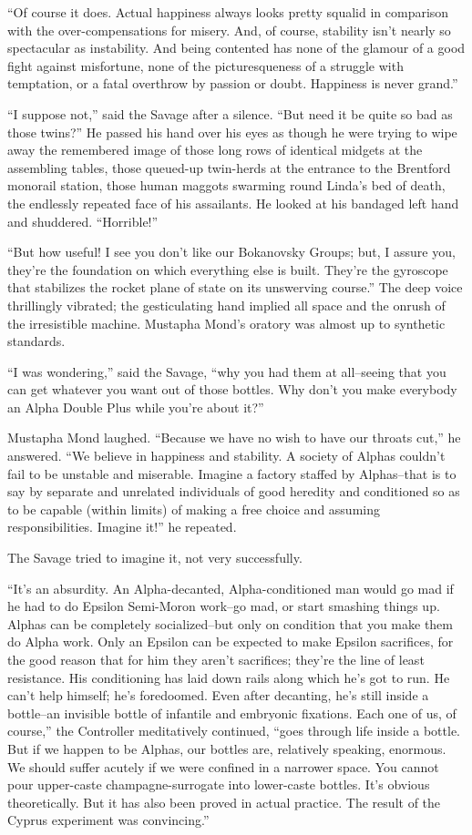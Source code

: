 \documentclass[12pt]{report}
\begin{document}
``Of course it does. Actual happiness always looks pretty squalid in
comparison with the over-compensations for misery. And, of course,
stability isn't nearly so spectacular as instability. And being
contented has none of the glamour of a good fight against misfortune,
none of the picturesqueness of a struggle with temptation, or a fatal
overthrow by passion or doubt. Happiness is never grand.''

``I suppose not,'' said the Savage after a silence. ``But need it be
quite so bad as those twins?'' He passed his hand over his eyes as
though he were trying to wipe away the remembered image of those long
rows of identical midgets at the assembling tables, those queued-up
twin-herds at the entrance to the Brentford monorail station, those
human maggots swarming round Linda's bed of death, the endlessly
repeated face of his assailants. He looked at his bandaged left hand and
shuddered. ``Horrible!''

``But how useful! I see you don't like our Bokanovsky Groups; but, I
assure you, they're the foundation on which everything else is built.
They're the gyroscope that stabilizes the rocket plane of state on its
unswerving course.'' The deep voice thrillingly vibrated; the
gesticulating hand implied all space and the onrush of the irresistible
machine. Mustapha Mond's oratory was almost up to synthetic standards.

``I was wondering,'' said the Savage, ``why you had them at all--seeing
that you can get whatever you want out of those bottles. Why don't you
make everybody an Alpha Double Plus while you're about it?''

Mustapha Mond laughed. ``Because we have no wish to have our throats
cut,'' he answered. ``We believe in happiness and stability. A society
of Alphas couldn't fail to be unstable and miserable. Imagine a factory
staffed by Alphas--that is to say by separate and unrelated individuals
of good heredity and conditioned so as to be capable (within limits) of
making a free choice and assuming responsibilities. Imagine it!'' he
repeated.

The Savage tried to imagine it, not very successfully.

``It's an absurdity. An Alpha-decanted, Alpha-conditioned man would go
mad if he had to do Epsilon Semi-Moron work--go mad, or start smashing
things up. Alphas can be completely socialized--but only on condition
that you make them do Alpha work. Only an Epsilon can be expected to
make Epsilon sacrifices, for the good reason that for him they aren't
sacrifices; they're the line of least resistance. His conditioning has
laid down rails along which he's got to run. He can't help himself; he's
foredoomed. Even after decanting, he's still inside a bottle--an
invisible bottle of infantile and embryonic fixations. Each one of us,
of course,'' the Controller meditatively continued, ``goes through life
inside a bottle. But if we happen to be Alphas, our bottles are,
relatively speaking, enormous. We should suffer acutely if we were
confined in a narrower space. You cannot pour upper-caste
champagne-surrogate into lower-caste bottles. It's obvious
theoretically. But it has also been proved in actual practice. The
result of the Cyprus experiment was convincing.''
\end{document}
